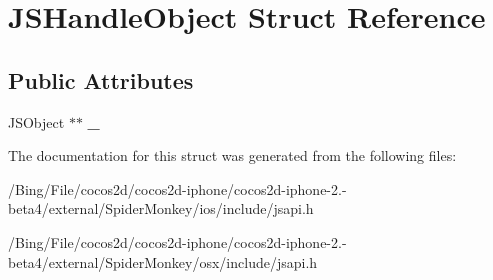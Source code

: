 \hypertarget{struct_j_s_handle_object}{\section{J\-S\-Handle\-Object Struct Reference}
\label{struct_j_s_handle_object}
}
\subsection*{Public Attributes}
\begin{DoxyCompactItemize}
\item 
\hypertarget{struct_j_s_handle_object_ac8ac0cab4375fdef78a96819a49820ab}{J\-S\-Object $\ast$$\ast$ {\bfseries \-\_\-}}\label{struct_j_s_handle_object_ac8ac0cab4375fdef78a96819a49820ab}

\end{DoxyCompactItemize}


The documentation for this struct was generated from the following files\-:\begin{DoxyCompactItemize}
\item 
/\-Bing/\-File/cocos2d/cocos2d-\/iphone/cocos2d-\/iphone-\/2.-\/beta4/external/\-Spider\-Monkey/ios/include/jsapi.\-h\item 
/\-Bing/\-File/cocos2d/cocos2d-\/iphone/cocos2d-\/iphone-\/2.-\/beta4/external/\-Spider\-Monkey/osx/include/jsapi.\-h\end{DoxyCompactItemize}
